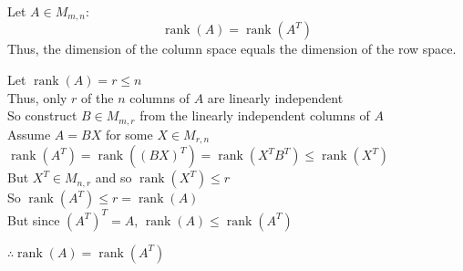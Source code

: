 \documentclass[letterpaper,12pt,fleqn]{article}
\DeclareMathOperator{\rnk}{rank}
\begin{document}
\begin{theorem}
  Let $A\in M_{m,n}$:
  \[\rnk(A)=\rnk(A^T)\]
  Thus, the dimension of the column space equals the dimension of the row
  space.
\end{theorem}
\newpage
\begin{theproof}
  Let $\rnk(A)=r\le n$ \\
  Thus, only $r$ of the $n$ columns of $A$ are linearly independent \\
  So construct $B\in M_{m,r}$ from the linearly independent columns of $A$ \\
  Assume $A=BX$ for some $X\in M_{r,n}$ \\
  $\rnk(A^T)=\rnk((BX)^T)=\rnk(X^TB^T)\le\rnk(X^T)$ \\
  But $X^T\in M_{n,r}$ and so $\rnk(X^T)\le r$ \\
  So $\rnk(A^T)\le r=\rnk(A)$ \\
  But since $(A^T)^T=A$, $\rnk(A)\le\rnk(A^T)$

  $\therefore \rnk(A)=\rnk(A^T)$
\end{theproof}
\end{document}
